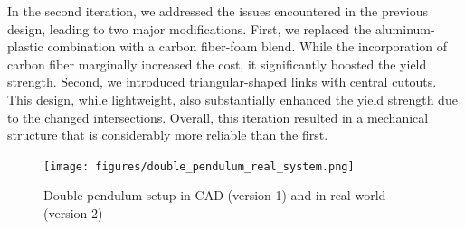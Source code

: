 In the second iteration, we addressed the issues encountered in the previous design, leading to two major modifications. First, we replaced the aluminum-plastic combination with a carbon fiber-foam blend. While the incorporation of carbon fiber marginally increased the cost, it significantly boosted the yield strength. Second, we introduced triangular-shaped links with central cutouts. This design, while lightweight, also substantially enhanced the yield strength due to the changed intersections. Overall, this iteration resulted in a mechanical structure that is considerably more reliable than the first.
\begin{figure}[htbp]
\begin{minipage}[b]{0.45\linewidth}
\centering
{}
\end{minipage}
\begin{minipage}[b]{0.45\linewidth}
\centering
\texttt{[image: figures/double\_pendulum\_real\_system.png]}
\end{minipage}
\caption{Double pendulum setup in CAD (version 1) and in real world (version 2)}
\end{figure}

